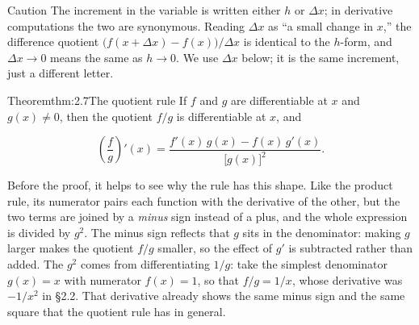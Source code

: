 \documentclass[a4paper,12pt,oneside]{memoir}
\begin{document}
\begin{envcaution}{Caution}{}{}
The increment in the variable is written either \(h\) or \(\Delta x\); in derivative computations the two are synonymous. Reading \(\Delta x\) as “a small change in \(x\),” the difference quotient \(\bigl(f(x + \Delta x) - f(x)\bigr)/\Delta x\) is identical to the \(h\)-form, and \(\Delta x \to 0\) means the same as \(h \to 0\). We use \(\Delta x\) below; it is the same increment, just a different letter.
\end{envcaution}
\begin{envtheorem}{Theorem}{thm:2.7}{The quotient rule}
If \(f\) and \(g\) are differentiable at \(x\) and \(g(x) \ne 0\), then the quotient \(f/g\) is differentiable at \(x\), and

\[ \left(\frac{f}{g}\right)'(x) = \frac{f'(x)\,g(x) - f(x)\,g'(x)}{\bigl[g(x)\bigr]^{2}}. \]
\end{envtheorem}
Before the proof, it helps to see why the rule has this shape. Like the product rule, its numerator pairs each function with the derivative of the other, but the two terms are joined by a \emph{minus} sign instead of a plus, and the whole expression is divided by \(g^{2}\). The minus sign reflects that \(g\) sits in the denominator: making \(g\) larger makes the quotient \(f/g\) smaller, so the effect of \(g'\) is subtracted rather than added. The \(g^{2}\) comes from differentiating \(1/g\): take the simplest denominator \(g(x) = x\) with numerator \(f(x) = 1\), so that \(f/g = 1/x\), whose derivative was \(-1/x^{2}\) in §2.2. That derivative already shows the same minus sign and the same square that the quotient rule has in general.
\end{document}
